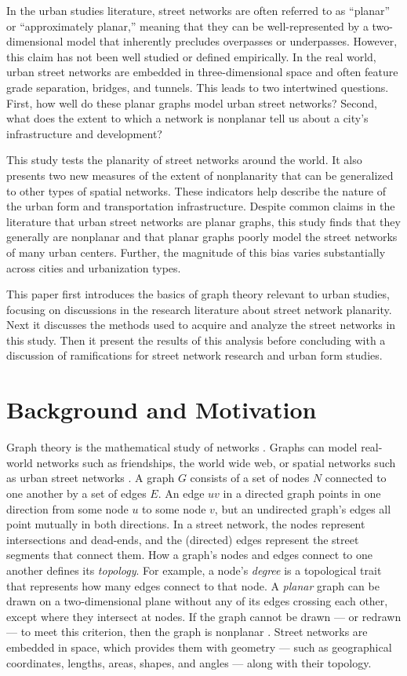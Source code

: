 \documentclass[Afour,sageh,times]{sagej}
\begin{document}
In the urban studies literature, street networks are often referred to as \enquote{planar} or \enquote{approximately planar,} meaning that they can be well-represented by a two-dimensional model that inherently precludes overpasses or underpasses. However, this claim has not been well studied or defined empirically. In the real world, urban street networks are embedded in three-dimensional space and often feature grade separation, bridges, and tunnels. This leads to two intertwined questions. First, how well do these planar graphs model urban street networks? Second, what does the extent to which a network is nonplanar tell us about a city's infrastructure and development?

This study tests the planarity of street networks around the world. It also presents two new measures of the extent of nonplanarity that can be generalized to other types of spatial networks. These indicators help describe the nature of the urban form and transportation infrastructure. Despite common claims in the literature that urban street networks are planar graphs, this study finds that they generally are nonplanar and that planar graphs poorly model the street networks of many urban centers. Further, the magnitude of this bias varies substantially across cities and urbanization types.

This paper first introduces the basics of graph theory relevant to urban studies, focusing on discussions in the research literature about street network planarity. Next it discusses the methods used to acquire and analyze the street networks in this study. Then it present the results of this analysis before concluding with a discussion of ramifications for street network research and urban form studies.


\section{Background and Motivation}

Graph theory is the mathematical study of networks \citep{newman_networks:_2010}. Graphs can model real-world networks such as friendships, the world wide web, or spatial networks such as urban street networks \citep{barthelemy_spatial_2011}. A graph $G$ consists of a set of nodes $N$ connected to one another by a set of edges $E$. An edge $uv$ in a directed graph points in one direction from some node $u$ to some node $v$, but an undirected graph's edges all point mutually in both directions. In a street network, the nodes represent intersections and dead-ends, and the (directed) edges represent the street segments that connect them. How a graph's nodes and edges connect to one another defines its \emph{topology}. For example, a node's \emph{degree} is a topological trait that represents how many edges connect to that node. A \emph{planar} graph can be drawn on a two-dimensional plane without any of its edges crossing each other, except where they intersect at nodes. If the graph cannot be drawn --- or redrawn --- to meet this criterion, then the graph is nonplanar \citep{trudeau_introduction_1994}. Street networks are embedded in space, which provides them with geometry --- such as geographical coordinates, lengths, areas, shapes, and angles --- along with their topology.
\end{document}
